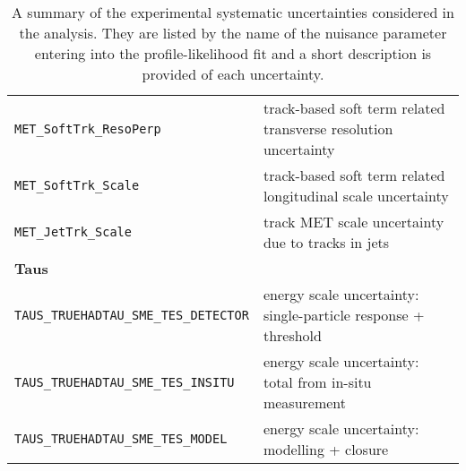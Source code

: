 \begin{table}
\begin{tabularx}{\textwidth}{LL}
    \texttt{MET\_SoftTrk\_ResoPerp} &  track-based soft term related transverse resolution uncertainty \\
    \texttt{MET\_SoftTrk\_Scale} & track-based soft term related longitudinal scale uncertainty \\
    \texttt{MET\_JetTrk\_Scale} & track MET scale uncertainty due to tracks in jets \\
    {\bfseries Taus}&\\
    \texttt{TAUS\_TRUEHADTAU\_SME\_TES\_DETECTOR} & energy scale uncertainty: single-particle response + threshold \\
    \texttt{TAUS\_TRUEHADTAU\_SME\_TES\_INSITU} & energy scale uncertainty: total from in-situ measurement \\
    \texttt{TAUS\_TRUEHADTAU\_SME\_TES\_MODEL} & energy scale uncertainty: modelling + closure \\
    \bottomrule
  \end{tabularx}
\caption[A summary of experimental systematic uncertainties.]{A summary of the
  experimental systematic uncertainties considered in the analysis. They are
  listed by the name of the nuisance parameter entering into the
  profile-likelihood fit and a short description is provided of each
  uncertainty.}
\label{tab:expSyst}
\end{table}